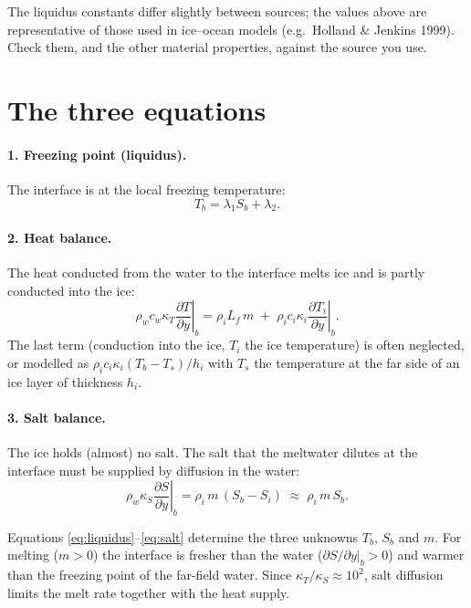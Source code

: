 \documentclass[11pt,a4paper]{article}
\begin{document}
The liquidus constants differ slightly between sources; the values above are representative of those
used in ice--ocean models (e.g.\ Holland \& Jenkins 1999). Check them, and the other material
properties, against the source you use.

\section{The three equations}

\paragraph{1. Freezing point (liquidus).} The interface is at the local freezing temperature:
\begin{equation}
  T_b = \lambda_1 S_b + \lambda_2 . \label{eq:liquidus}
\end{equation}

\paragraph{2. Heat balance.} The heat conducted from the water to the interface melts ice and is
partly conducted into the ice:
\begin{equation}
  \rho_w c_w \kappa_T \left.\frac{\partial T}{\partial y}\right|_b
  = \rho_i L_f\, m \;+\; \rho_i c_i \kappa_i \left.\frac{\partial T_i}{\partial y}\right|_b . \label{eq:heat}
\end{equation}
The last term (conduction into the ice, $T_i$ the ice temperature) is often neglected, or modelled as
$\rho_i c_i \kappa_i (T_b - T_s)/h_i$ with $T_s$ the temperature at the far side of an ice layer of
thickness $h_i$.

\paragraph{3. Salt balance.} The ice holds (almost) no salt. The salt that the meltwater dilutes at the
interface must be supplied by diffusion in the water:
\begin{equation}
  \rho_w \kappa_S \left.\frac{\partial S}{\partial y}\right|_b = \rho_i\, m\, (S_b - S_i)
  \;\approx\; \rho_i\, m\, S_b . \label{eq:salt}
\end{equation}

Equations \eqref{eq:liquidus}--\eqref{eq:salt} determine the three unknowns $T_b$, $S_b$ and $m$.
For melting ($m>0$) the interface is fresher than the water ($\partial S/\partial y|_b>0$) and warmer
than the freezing point of the far-field water. Since $\kappa_T/\kappa_S \approx 10^2$, salt
diffusion limits the melt rate together with the heat supply.
\end{document}

